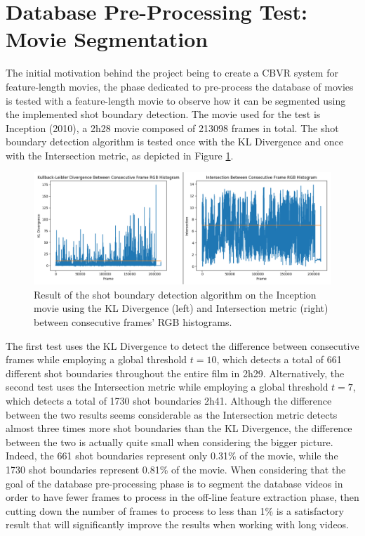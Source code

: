 
\section{Database Pre-Processing Test: Movie Segmentation}
\label{sec:evaluation-movie-segmentation-test}

The initial motivation behind the project being to create a CBVR system for feature-length movies, the phase dedicated to pre-process the database of movies is tested with a feature-length movie to observe how it can be segmented using the implemented shot boundary detection. The movie used for the test is Inception (2010), a 2h28 movie composed of 213098 frames in total. The shot boundary detection algorithm is tested once with the KL Divergence and once with the Intersection metric, as depicted in Figure \ref{fig:evaluation-inception_shot_boundary_detection_test}.\\

\begin{figure}[h] 
\centerline{\includegraphics[width=\textwidth]{figures/evaluation/inception_shot_boundary_detection_test.png}}
\caption{\label{fig:evaluation-inception_shot_boundary_detection_test}Result of the shot boundary detection algorithm on the Inception movie using the KL Divergence (left) and Intersection metric (right) between consecutive frames' RGB histograms.}
\end{figure}

The first test uses the KL Divergence to detect the difference between consecutive frames while employing a global threshold $t=10$, which detects a total of 661 different shot boundaries throughout the entire film in 2h29. Alternatively, the second test uses the Intersection metric while employing a global threshold $t=7$, which detects a total of 1730 shot boundaries 2h41. Although the difference between the two results seems considerable as the Intersection metric detects almost three times more shot boundaries than the KL Divergence, the difference between the two is actually quite small when considering the bigger picture. Indeed, the 661 shot boundaries represent only 0.31\% of the movie, while the 1730 shot boundaries represent 0.81\% of the movie. When considering that the goal of the database pre-processing phase is to segment the database videos in order to have fewer frames to process in the off-line feature extraction phase, then cutting down the number of frames to process to less than 1\% is a satisfactory result that will significantly improve the results when working with long videos.

